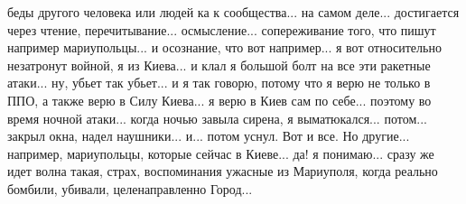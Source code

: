 беды другого человека или людей ка к сообщества... на самом деле... достигается
через чтение, перечитывание... осмысление... сопереживание того, что пишут
например мариупольцы... и осознание, что вот например... я вот относительно
незатронут войной, я из Киева... и клал я большой болт на все эти ракетные
атаки... ну, убьет так убьет... и я так говорю, потому что я верю не только в
ППО, а также верю в Силу Киева... я верю в Киев сам по себе... поэтому во время
ночной атаки... когда ночью завыла сирена, я выматюкался... потом... закрыл
окна, надел наушники... и... потом уснул. Вот и все. Но другие... например,
мариупольцы, которые сейчас в Киеве... да! я понимаю... сразу же идет волна
такая, страх, воспоминания ужасные из Мариуполя, когда реально бомбили,
убивали, целенаправленно Город... 
